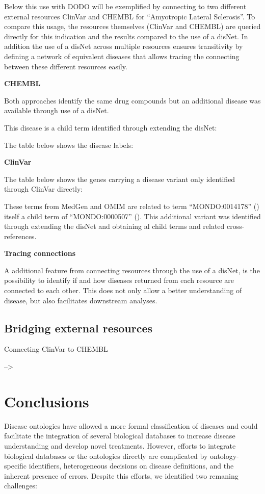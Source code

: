 \documentclass[9pt,a4paper,]{extarticle}
\begin{document}
Below this use with DODO will be exemplified by connecting to two different external resources ClinVar and CHEMBL for ``Amyotropic Lateral Sclerosis''. To compare this usage, the resources themselves (ClinVar and CHEMBL) are queried directly for this indication and the results compared to the use of a disNet. In addition the use of a disNet across multiple resources ensures transitivity by defining a network of equivalent diseases that allows tracing the connecting between these different resources easily.

\textbf{CHEMBL}

Both approaches identify the same drug compounds but an additional disease was available through use of a disNet.

This disease is a child term identified through extending the disNet:

The table below shows the disease labels:

\textbf{ClinVar}

The table below shows the genes carrying a disease variant only identified through ClinVar directly:

These terms from MedGen and OMIM are related to term ``MONDO:0014178'' () itself a child term of ``MONDO:0000507'' (). This additional variant was identified through extending the disNet and obtaining al child terms and related cross-references.

\textbf{Tracing connections}

A additional feature from connecting resources through the use of a disNet, is the possibility to identify if and how diseases returned from each resource are connected to each other. This does not only allow a better understanding of disease, but also facilitates downstream analyses.

\hypertarget{bridging-external-resources}{%
\subsection{Bridging external resources}\label{bridging-external-resources}}

Connecting ClinVar to CHEMBL

--\textgreater{}

\hypertarget{conclusions}{%
\section{Conclusions}\label{conclusions}}

Disease ontologies have allowed a more formal classification of diseases and could facilitate the integration of several biological databases to increase disease understanding and develop novel treatments. However, efforts to integrate biological databases or the ontologies directly are complicated by ontology-specific identifiers, heterogeneous decisions on disease definitions, and the inherent presence of errors. Despite this efforts, we identified two remaning challenges:
\end{document}
